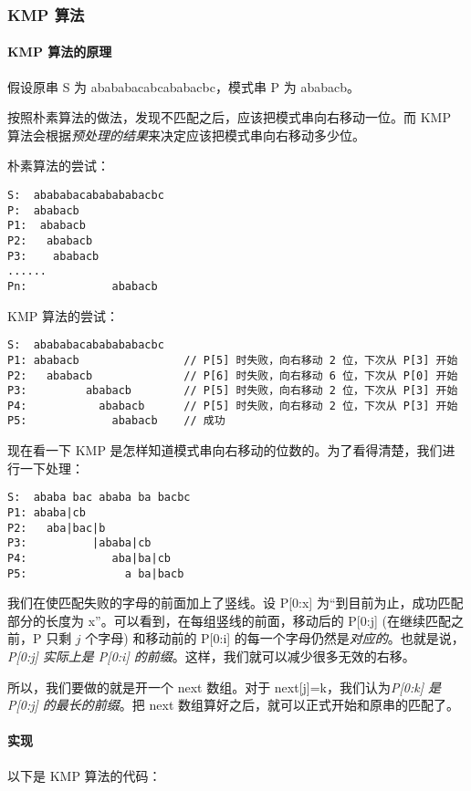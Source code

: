 \subsubsection{KMP 算法}
\paragraph{KMP 算法的原理}
	假设原串 S 为 abababacabcababacbc，模式串 P 为 ababacb。

	按照朴素算法的做法，发现不匹配之后，应该把模式串向右移动一位。而 KMP 算法会根据\emph{预处理的结果}来决定应该把模式串向右移动多少位。
	
	朴素算法的尝试：
	
	\begin{lstlisting}
S:  abababacababababacbc
P:  ababacb
P1:  ababacb
P2:   ababacb
P3:    ababacb
......
Pn:             ababacb
	\end{lstlisting}
	
	KMP 算法的尝试：
	
	\begin{lstlisting}
S:  abababacababababacbc
P1: ababacb                // P[5] 时失败，向右移动 2 位，下次从 P[3] 开始
P2:   ababacb              // P[6] 时失败，向右移动 6 位，下次从 P[0] 开始
P3:         ababacb        // P[5] 时失败，向右移动 2 位，下次从 P[3] 开始
P4:           ababacb      // P[5] 时失败，向右移动 2 位，下次从 P[3] 开始
P5:             ababacb    // 成功	
	\end{lstlisting}
	
	现在看一下 KMP 是怎样知道模式串向右移动的位数的。为了看得清楚，我们进行一下处理：
	
	\begin{lstlisting}
S:  ababa bac ababa ba bacbc
P1: ababa|cb  
P2:   aba|bac|b
P3:          |ababa|cb
P4:             aba|ba|cb
P5:               a ba|bacb
	\end{lstlisting}
	
	我们在使匹配失败的字母的前面加上了竖线。设 P[0:x] 为“到目前为止，成功匹配部分的长度为 x”。可以看到，在每组竖线的前面，移动后的 P[0:j] (在继续匹配之前，P 只剩 $j$ 个字母) 和移动前的 P[0:i] 的每一个字母仍然是\emph{对应的}。也就是说，\emph{P[0:j] 实际上是 P[0:i] 的前缀}。这样，我们就可以减少很多无效的右移。
	
	所以，我们要做的就是开一个 next 数组。对于 next[j]=k，我们认为\emph{P[0:k] 是 P[0:j] 的最长的前缀}。把 next 数组算好之后，就可以正式开始和原串的匹配了。
	
\paragraph{实现}
	以下是 KMP 算法的代码：
	
	